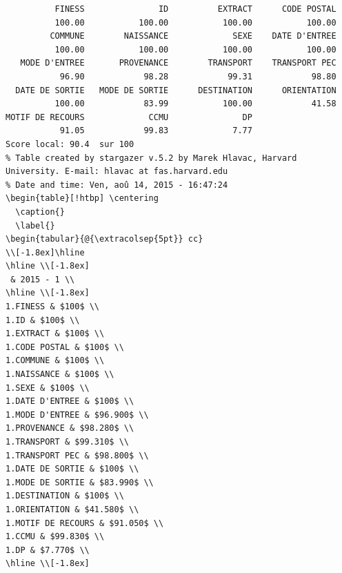 \documentclass[]{article}
\begin{document}
\begin{verbatim}
          FINESS               ID          EXTRACT      CODE POSTAL 
          100.00           100.00           100.00           100.00 
         COMMUNE        NAISSANCE             SEXE    DATE D'ENTREE 
          100.00           100.00           100.00           100.00 
   MODE D'ENTREE       PROVENANCE        TRANSPORT    TRANSPORT PEC 
           96.90            98.28            99.31            98.80 
  DATE DE SORTIE   MODE DE SORTIE      DESTINATION      ORIENTATION 
          100.00            83.99           100.00            41.58 
MOTIF DE RECOURS             CCMU               DP 
           91.05            99.83             7.77 
Score local: 90.4  sur 100
% Table created by stargazer v.5.2 by Marek Hlavac, Harvard University. E-mail: hlavac at fas.harvard.edu
% Date and time: Ven, aoû 14, 2015 - 16:47:24
\begin{table}[!htbp] \centering 
  \caption{} 
  \label{} 
\begin{tabular}{@{\extracolsep{5pt}} cc} 
\\[-1.8ex]\hline 
\hline \\[-1.8ex] 
 & 2015 - 1 \\ 
\hline \\[-1.8ex] 
1.FINESS & $100$ \\ 
1.ID & $100$ \\ 
1.EXTRACT & $100$ \\ 
1.CODE POSTAL & $100$ \\ 
1.COMMUNE & $100$ \\ 
1.NAISSANCE & $100$ \\ 
1.SEXE & $100$ \\ 
1.DATE D'ENTREE & $100$ \\ 
1.MODE D'ENTREE & $96.900$ \\ 
1.PROVENANCE & $98.280$ \\ 
1.TRANSPORT & $99.310$ \\ 
1.TRANSPORT PEC & $98.800$ \\ 
1.DATE DE SORTIE & $100$ \\ 
1.MODE DE SORTIE & $83.990$ \\ 
1.DESTINATION & $100$ \\ 
1.ORIENTATION & $41.580$ \\ 
1.MOTIF DE RECOURS & $91.050$ \\ 
1.CCMU & $99.830$ \\ 
1.DP & $7.770$ \\ 
\hline \\[-1.8ex] 

\end{verbatim}
\end{document}
